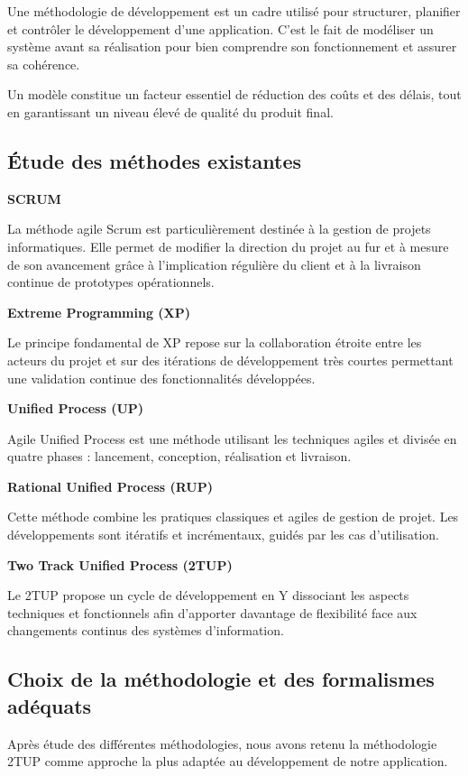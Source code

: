 Une méthodologie de développement est un cadre utilisé pour structurer, planifier et contrôler le développement d'une application. C'est le fait de modéliser un système avant sa réalisation pour bien comprendre son fonctionnement et assurer sa cohérence.

Un modèle constitue un facteur essentiel de réduction des coûts et des délais, tout en garantissant un niveau élevé de qualité du produit final.

\subsection{Étude des méthodes existantes}

\textbf{SCRUM}

La méthode agile Scrum est particulièrement destinée à la gestion de projets informatiques. Elle permet de modifier la direction du projet au fur et à mesure de son avancement grâce à l'implication régulière du client et à la livraison continue de prototypes opérationnels.

\textbf{Extreme Programming (XP)}

Le principe fondamental de XP repose sur la collaboration étroite entre les acteurs du projet et sur des itérations de développement très courtes permettant une validation continue des fonctionnalités développées.

\textbf{Unified Process (UP)}

Agile Unified Process est une méthode utilisant les techniques agiles et divisée en quatre phases : lancement, conception, réalisation et livraison.

\textbf{Rational Unified Process (RUP)}

Cette méthode combine les pratiques classiques et agiles de gestion de projet. Les développements sont itératifs et incrémentaux, guidés par les cas d'utilisation.

\textbf{Two Track Unified Process (2TUP)}

Le 2TUP propose un cycle de développement en Y dissociant les aspects techniques et fonctionnels afin d'apporter davantage de flexibilité face aux changements continus des systèmes d'information.

\subsection{Choix de la méthodologie et des formalismes adéquats}

Après étude des différentes méthodologies, nous avons retenu la méthodologie 2TUP comme approche la plus adaptée au développement de notre application.

